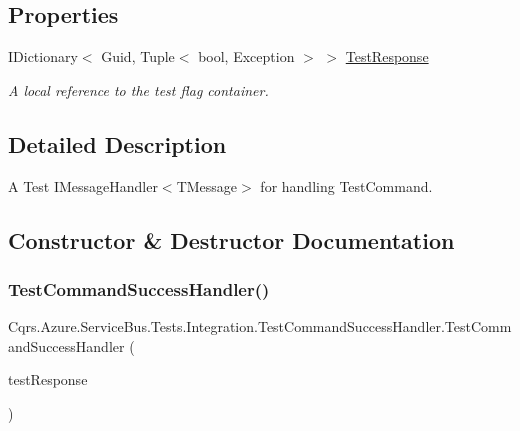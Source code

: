 \subsection*{Properties}
\begin{DoxyCompactItemize}
\item 
I\+Dictionary$<$ Guid, Tuple$<$ bool, Exception $>$ $>$ \hyperlink{classCqrs_1_1Azure_1_1ServiceBus_1_1Tests_1_1Integration_1_1TestCommandSuccessHandler_a2e843e55bab5553cd1ecfaa330d76ef2_a2e843e55bab5553cd1ecfaa330d76ef2}{Test\+Response}
\begin{DoxyCompactList}\small\item\em A local reference to the test flag container. \end{DoxyCompactList}\end{DoxyCompactItemize}


\subsection{Detailed Description}
A Test I\+Message\+Handler$<$\+T\+Message$>$ for handling Test\+Command. 



\subsection{Constructor \& Destructor Documentation}
\mbox{\label{classCqrs_1_1Azure_1_1ServiceBus_1_1Tests_1_1Integration_1_1TestCommandSuccessHandler_a1ffd3c5c1e179f38bbccbbdec48e9701_a1ffd3c5c1e179f38bbccbbdec48e9701}} 
\subsubsection{\texorpdfstring{Test\+Command\+Success\+Handler()}{TestCommandSuccessHandler()}}
{\footnotesize\ttfamily Cqrs.\+Azure.\+Service\+Bus.\+Tests.\+Integration.\+Test\+Command\+Success\+Handler.\+Test\+Command\+Success\+Handler (\begin{DoxyParamCaption}\item[{I\+Dictionary$<$ Guid, Tuple$<$ bool, Exception $>$$>$}]{test\+Response }\end{DoxyParamCaption})}



